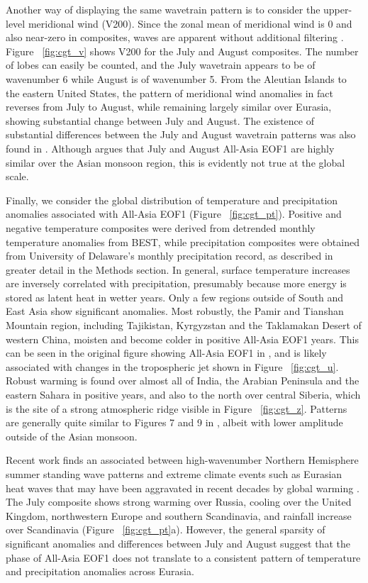 	Another way of displaying the same wavetrain pattern is to consider the upper-level meridional wind (V200). Since the zonal mean of meridional wind is 0 and also near-zero in composites, waves are apparent without additional filtering \citep{Branstator2002}. Figure ~\ref{fig:cgt_v} shows V200 for the July and August composites. The number of lobes can easily be counted, and the July wavetrain appears to be of wavenumber 6 while August is of wavenumber 5. From the Aleutian Islands to the eastern United States, the pattern of meridional wind anomalies in fact reverses from July to August, while remaining largely similar over Eurasia, showing substantial change between July and August. The existence of substantial differences between the July and August wavetrain patterns was also found in \citet{Ding2005a}. Although \citet{Day2015} argues that July and August All-Asia EOF1 are highly similar over the Asian monsoon region, this is evidently not true at the global scale.
	
	Finally, we consider the global distribution of temperature and precipitation anomalies associated with All-Asia EOF1 (Figure ~\ref{fig:cgt_pt}). Positive and negative temperature composites were derived from detrended monthly temperature anomalies from BEST, while precipitation composites were obtained from University of Delaware's monthly precipitation record, as described in greater detail in the Methods section. In general, surface temperature increases are inversely correlated with precipitation, presumably because more energy is stored as latent heat in wetter years. Only a few regions outside of South and East Asia show significant anomalies. Most robustly, the Pamir and Tianshan Mountain region, including Tajikistan, Kyrgyzstan and the Taklamakan Desert of western China, moisten and become colder in positive All-Asia EOF1 years. This can be seen in the original figure showing All-Asia EOF1 in \citet{Day2015}, and is likely associated with changes in the tropospheric jet shown in Figure ~\ref{fig:cgt_u}. Robust warming is found over almost all of India, the Arabian Peninsula and the eastern Sahara in positive years, and also to the north over central Siberia, which is the site of a strong atmospheric ridge visible in Figure ~\ref{fig:cgt_z}. Patterns are generally quite similar to Figures 7 and 9 in \citet{Ding2005a}, albeit with lower amplitude outside of the Asian monsoon.
	
	Recent work finds an associated between high-wavenumber Northern Hemisphere summer standing wave patterns and extreme climate events such as Eurasian heat waves that may have been aggravated in recent decades by global warming \citep{Petoukhov2013,Schubert2014a}. The July composite shows strong warming over Russia, cooling over the United Kingdom, northwestern Europe and southern Scandinavia, and rainfall increase over Scandinavia (Figure ~\ref{fig:cgt_pt}a). However, the general sparsity of significant anomalies and differences between July and August suggest that the phase of All-Asia EOF1 does not translate to a consistent pattern of temperature and precipitation anomalies across Eurasia.
	
